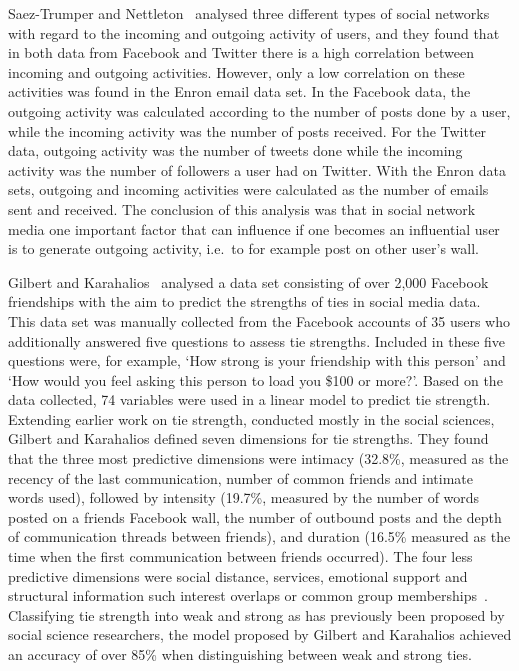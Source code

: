 \documentclass[letterpaper]{article}
\begin{document}
Saez-Trumper and Nettleton~\cite{saez2011high} analysed three different types of social networks with regard to the incoming and outgoing activity of users, and they found that in both data from Facebook and Twitter there is a high correlation between incoming and outgoing activities. However, only a low correlation on these activities was found in the Enron email data set. In the Facebook data, the outgoing activity was calculated according to the number of posts done by a user, while the incoming activity was the number of posts received. For the Twitter data, outgoing activity was the number of tweets done while the incoming activity was the number of followers a user had on Twitter. With the Enron data sets, outgoing and incoming activities were calculated as the number of emails sent and received. The conclusion of this analysis was that in social network media one important factor that can influence if one becomes an influential user is to generate outgoing activity, i.e.\ to for example post on other user's wall.




Gilbert and Karahalios~\cite{gilbert2009predicting} analysed a data set consisting of over 2,000 Facebook friendships with the aim to predict the strengths of ties in social media data. This data set was manually collected from the Facebook accounts of 35 users who additionally answered five questions to assess tie strengths. Included in these five questions were, for example, `How strong is your friendship with this person' and `How would you feel asking this person to load you \$100 or more?'. Based on the data collected, 74 variables were used in a linear model to predict tie strength. Extending earlier work on tie strength, conducted mostly in the social sciences, Gilbert and Karahalios defined seven dimensions for tie strengths. They found that the three most predictive dimensions were intimacy (32.8\%, measured as the recency of the last communication, number of common friends and intimate words used), followed by intensity (19.7\%, measured by the number of words posted on a friends Facebook wall, the number of outbound posts and the depth of communication threads between friends), and duration (16.5\% measured as the time when the first communication between friends occurred). The four less predictive dimensions were social distance, services, emotional support and structural information such interest overlaps or common group memberships~\cite{gilbert2009predicting}. Classifying tie strength into weak and strong as has previously been proposed by social science researchers, the model proposed by Gilbert and Karahalios achieved an accuracy of over 85\% when distinguishing between weak and strong ties.
\end{document}
